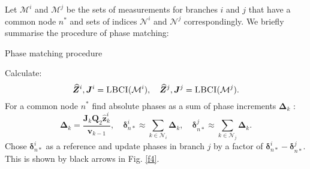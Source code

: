 \documentclass[journal,10pt,onecolumn,draftclsnofoot,]{IEEEtran}
\theoremstyle{plain}
\theoremstyle{definition}
\theoremstyle{remark}
\begin{document}
Let $\mathcal{M}^{i}$ and $\mathcal{M}^{j}$ be the sets of measurements for branches $i$ and $j$ that have a common node $n^*$ and sets of indices $\mathcal{N}^i$ and $\mathcal{N}^j$ correspondingly. We briefly summarise the procedure of phase matching:
\begin{algorithm}[H]
\caption{Phase matching procedure}
\label{phase_matching_procedure}
\begin{algorithmic}[1]
\State Calculate: $$\widehat{\bm{Z}}^i, \bm{J}^i =\textproc{LBCI}(\mathcal{M}^i), \quad \widehat{\bm{Z}}^j, \bm{J}^j = \textproc{LBCI}(\mathcal{M}^j).$$
\State For a common node $n^*$ find absolute phases as a sum of phase increments $\bm{\Delta}_{k}$ \footnotemark:
$$\bm{\Delta}_{k} = \frac{\bm{J}_{k}\bm{Q}_2 \widehat{\bm{z}}^i_{k}}{\bm{v}_{k-1}}, \quad \bm{\delta}^i_{n*} \approx \sum_{k \in \mathcal{N}_i} \bm{\Delta}_{k} , \quad \bm{\delta}^j_{n*} \approx \sum_{k \in \mathcal{N}_j} \bm{\Delta}_{k}.$${}
\State Chose $\bm{\delta}^i_{n*}$ as a reference and update phases in branch $j$ by a factor of $\bm{\delta}^i_{n*} - \bm{\delta}^j_{n*}$. This is shown by black arrows in Fig. \ref{f4}.
\end{algorithmic}
\end{algorithm}
\end{document}
